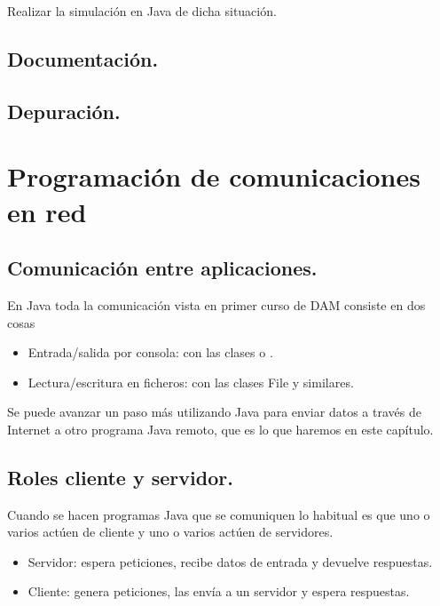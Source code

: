 \documentclass[a4paper,12pt,spanish]{sphinxmanual}
\begin{document}
Realizar la simulación en Java de dicha situación.


\section{Documentación.}
\label{textos/tema2:documentacion}

\section{Depuración.}
\label{textos/tema2:depuracion}

\chapter{{}Programación de comunicaciones en red}
\label{textos/tema3::doc}\label{textos/tema3:programacion-de-comunicaciones-en-red}

\section{Comunicación entre aplicaciones.}
\label{textos/tema3:comunicacion-entre-aplicaciones}
En Java toda la comunicación vista en primer curso de DAM consiste en dos cosas
\begin{itemize}
\item {} 
Entrada/salida por consola: con las clases  o .

\item {} 
Lectura/escritura en ficheros: con las clases File y similares.

\end{itemize}

Se puede avanzar un paso más utilizando Java para enviar datos a través de Internet a otro programa Java remoto, que es lo que haremos en este capítulo.


\section{Roles cliente y servidor.}
\label{textos/tema3:roles-cliente-y-servidor}
Cuando se hacen programas Java que se comuniquen lo habitual es que uno o varios actúen de cliente y uno o varios actúen de servidores.
\begin{itemize}
\item {} 
Servidor: espera peticiones, recibe datos de entrada y devuelve respuestas.

\item {} 
Cliente: genera peticiones, las envía a un servidor y espera respuestas.

\end{itemize}
\end{document}
